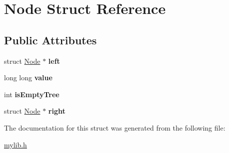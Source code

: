 \hypertarget{structNode}{
\section{Node Struct Reference}
\label{structNode}
}
\subsection*{Public Attributes}
\begin{DoxyCompactItemize}
\item 
\hypertarget{structNode_ad0976834843c7618677d22a10c495b36}{
struct \hyperlink{structNode}{Node} $\ast$ {\bfseries left}}
\label{structNode_ad0976834843c7618677d22a10c495b36}

\item 
\hypertarget{structNode_ab6eac5bf5ed32d0a925ed0bef738b6f0}{
long long {\bfseries value}}
\label{structNode_ab6eac5bf5ed32d0a925ed0bef738b6f0}

\item 
\hypertarget{structNode_ae247d0d284eeaedbc1ddfe184c3bda34}{
int {\bfseries isEmptyTree}}
\label{structNode_ae247d0d284eeaedbc1ddfe184c3bda34}

\item 
\hypertarget{structNode_af99e7102380da88d7c079fa264230cf4}{
struct \hyperlink{structNode}{Node} $\ast$ {\bfseries right}}
\label{structNode_af99e7102380da88d7c079fa264230cf4}

\end{DoxyCompactItemize}


The documentation for this struct was generated from the following file:\begin{DoxyCompactItemize}
\item 
\hyperlink{mylib_8h}{mylib.h}\end{DoxyCompactItemize}
